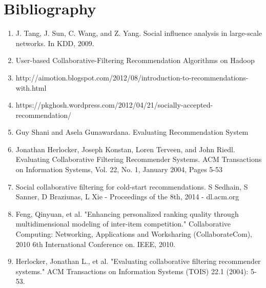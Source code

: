 \documentclass[12pt]{article} %
\begin{document}
\section{Bibliography}
\begin{enumerate}
\item J. Tang, J. Sun, C. Wang, and Z. Yang. Social influence analysis in large-scale networks. In KDD, 2009.
\item User-based Collaborative-Filtering Recommendation Algorithms on Hadoop
\item http://aimotion.blogspot.com/2012/08/introduction-to-recommendations-with.html
\item https://pkghosh.wordpress.com/2012/04/21/socially-accepted-recommendation/
\item Guy Shani and Asela Gunawardana. Evaluating Recommendation System
\item Jonathan Herlocker, Joseph Konstan, Loren Terveen, and John Riedl. Evaluating Collaborative Filtering Recommender Systems. ACM Transactions on Information Systems, Vol. 22, No. 1, January 2004, Pages 5-53 
\item Social collaborative filtering for cold-start recommendations. S Sedhain, S Sanner, D Braziunas, L Xie - Proceedings of the 8th, 2014 - dl.acm.org 
\item Feng, Qinyuan, et al. "Enhancing personalized ranking quality through multidimensional modeling of inter-item competition." Collaborative Computing: Networking, Applications and Worksharing (CollaborateCom), 2010 6th International Conference on. IEEE, 2010.
\item Herlocker, Jonathan L., et al. "Evaluating collaborative filtering recommender systems." ACM Transactions on Information Systems (TOIS) 22.1 (2004): 5-53.
\end{enumerate}
\end{document}

